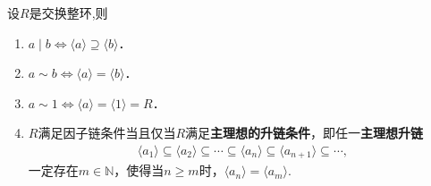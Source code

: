 \documentclass[../../main.tex]{subfiles}%
\begin{document}
\begin{theorem}\label{theorem:整除与主理想的关系}
设$R$是交换整环,则
\begin{enumerate}[(1)]
\item\label{theorem:整除与主理想的关系-1} $a \mid b\iff \langle a \rangle \supseteq \langle b \rangle$．

\item\label{theorem:整除与主理想的关系-2} $a \sim b\iff \langle a \rangle = \langle b \rangle$．

\item\label{theorem:整除与主理想的关系-3} $a \sim 1\iff \langle a \rangle = \langle 1 \rangle = R$．

\item\label{theorem:整除与主理想的关系-4} $R$满足因子链条件当且仅当$R$满足\textbf{主理想的升链条件}，即任一\textbf{主理想升链}
\begin{align*}
\langle a_1 \rangle \subseteq \langle a_2 \rangle \subseteq \cdots \subseteq \langle a_n \rangle \subseteq \langle a_{n+1} \rangle \subseteq \cdots,
\end{align*}
一定存在$m\in \mathbb{N}$，使得当$n \geqslant m$时，$\langle a_n \rangle = \langle a_m \rangle$.
\end{enumerate}
\end{theorem}
\end{document}
